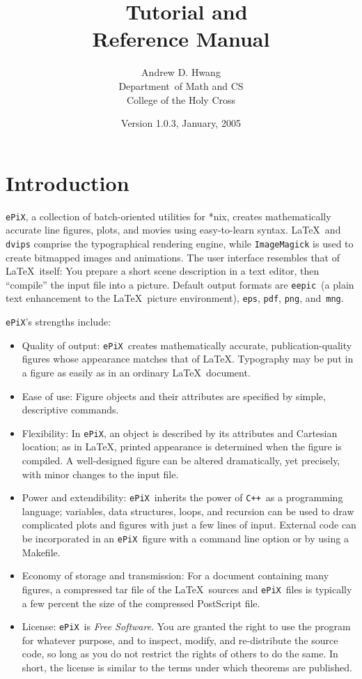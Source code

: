 \documentclass[12pt]{report}
\title{ \ePiX\ Tutorial and  \\ Reference Manual}
\author{Andrew D. Hwang \\ 
  Department\ of Math and CS \\ 
  College of the Holy Cross}
\date{Version 1.0.3,  January, 2005}
\newcommand{\code}[1]{\texttt{#1}}
\newcommand{\ePiX}{\code{ePiX}}
\newcommand{\eepic}{\code{eepic}}
\newcommand{\CXX}{\code{C++}}
\begin{document}
\maketitle

\tableofcontents

\chapter{Introduction}

\ePiX, a collection of batch-oriented utilities for *nix, creates
mathematically accurate line figures, plots, and movies using
easy-to-learn syntax. \LaTeX~and \code{dvips} comprise the
typographical rendering engine, while \code{ImageMagick} is used to
create bitmapped images and animations.  The user interface resembles
that of \LaTeX\ itself: You prepare a short scene description in a
text editor, then ``compile'' the input file into a picture. Default
output formats are \eepic\ (a plain text enhancement to the \LaTeX\
picture environment), \code{eps}, \code{pdf}, \code{png},
and~\code{mng}. 

\ePiX's strengths include:
 
\begin{itemize}
\item Quality of output: \ePiX\ creates mathematically accurate,
  publication-quality figures whose appearance matches that of \LaTeX.
  Typography may be put in a figure as easily as in an ordinary
  \LaTeX\ document.
  
\item Ease of use: Figure objects and their attributes are specified
  by simple, descriptive commands.
  
\item Flexibility: In \ePiX, an object is described by its attributes
  and Cartesian location; as in \LaTeX, printed appearance is
  determined when the figure is compiled. A well-designed figure can
  be altered dramatically, yet precisely, with minor changes to the
  input file.
  
\item Power and extendibility: \ePiX\ inherits the power of \CXX\ as a
  programming language; variables, data structures, loops, and
  recursion can be used to draw complicated plots and figures with
  just a few lines of input. External code can be incorporated in an
  \ePiX\ figure with a command line option or by using a Makefile.
  
\item Economy of storage and transmission: For a document containing
  many figures, a compressed tar file of the \LaTeX\ sources and
  \ePiX\ files is typically a few percent the size of the compressed
  PostScript file.
  
\item License: \ePiX\ is \emph{Free Software}.
  You are granted the right to use the program for whatever purpose,
  and to inspect, modify, and re-distribute the source code, so long
  as you do not restrict the rights of others to do the same. In
  short, the license is similar to the terms under which theorems are
  published.
  
\end{itemize}
\end{document}
